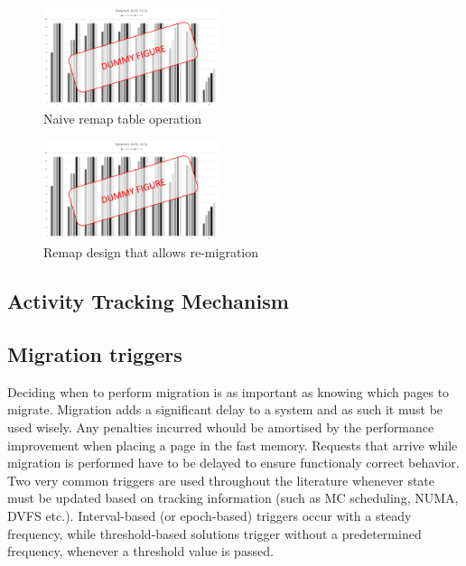 \begin{enumerate}
\end{enumerate}


\begin{figure}[h]
  \includegraphics[width=0.46\textwidth]{figures/dummy.pdf}
  \caption{Naive remap table operation}
  \label{fig:failed_remap}
\end{figure}

\begin{figure}[h]
  \includegraphics[width=0.46\textwidth]{figures/dummy.pdf}
  \caption{Remap design that allows re-migration}
  \label{fig:correct_remap}
\end{figure}


\subsection{Activity Tracking Mechanism}
\label{sec:tracking}


\subsection{Migration triggers}
Deciding when to perform migration is as important as knowing which pages to migrate. Migration adds a significant delay to a system and as such it must be used wisely. Any penalties incurred whould be amortised by the performance improvement when placing a page in the fast memory. Requests that arrive while migration is performed have to be delayed to ensure functionaly correct behavior. Two very common triggers are used throughout the literature whenever state must be updated based on tracking information (such as MC scheduling, NUMA, DVFS etc.). Interval-based (or epoch-based) triggers occur with a steady frequency, while threshold-based solutions trigger without a predetermined frequency, whenever a threshold value is passed. 


